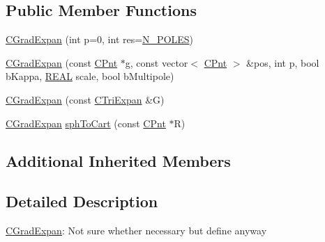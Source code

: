 \subsection*{Public Member Functions}
\begin{DoxyCompactItemize}
\item 
\hyperlink{classCGradExpan_a4ddece353cfe42d5e43da09f8897d74a}{C\-Grad\-Expan} (int p=0, int res=\hyperlink{expansion_8h_ac23f9c13c5d07d9ce386f7a830c35e5a}{N\-\_\-\-P\-O\-L\-E\-S})
\item 
\hyperlink{classCGradExpan_a3c7cd4c78753f7809c5adb15cccf8ddb}{C\-Grad\-Expan} (const \hyperlink{classCPnt}{C\-Pnt} $\ast$g, const vector$<$ \hyperlink{classCPnt}{C\-Pnt} $>$ \&pos, int p, bool b\-Kappa, \hyperlink{util_8h_a5821460e95a0800cf9f24c38915cbbde}{R\-E\-A\-L} scale, bool b\-Multipole)
\item 
\hyperlink{classCGradExpan_a48acf31a1b0f93096b36979b0a183c6e}{C\-Grad\-Expan} (const \hyperlink{classCTriExpan}{C\-Tri\-Expan} \&G)
\item 
\hyperlink{classCGradExpan}{C\-Grad\-Expan} \hyperlink{classCGradExpan_a3cde1e2392ceb3319d808717da1cf990}{sph\-To\-Cart} (const \hyperlink{classCPnt}{C\-Pnt} $\ast$R)
\end{DoxyCompactItemize}
\subsection*{Additional Inherited Members}


\subsection{Detailed Description}

\begin{DoxyItemize}
\item \hyperlink{classCGradExpan}{C\-Grad\-Expan}\-: Not sure whether necessary but define anyway 
\end{DoxyItemize}

